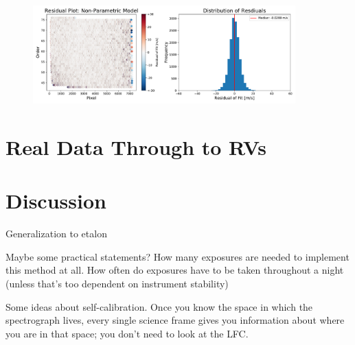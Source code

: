 \documentclass[12pt, letterpaper]{article}
\newcommand{\acronym}[1]{{\small{#1}}}
\newcommand{\lfc}{\acronym{LFC}}
\begin{document}
\begin{figure}[h]
\centering
\includegraphics[width=0.9\textwidth]{Figures/noHierc.pdf}
\caption{}
\label{fig:intpFit}
\end{figure} 

\section{Real Data Through to RVs} \label{sec:realdata}

\section{Discussion} \label{sec:discussion}

Generalization to etalon

Maybe some practical statements?  How many exposures are needed to implement this method at all.  How often do exposures have to be taken throughout a night (unless that's too dependent on instrument stability)

Some ideas about self-calibration. Once you know the space in which the
spectrograph lives, every single science frame gives you information about
where you are in that space; you don't need to look at the \lfc.
\end{document}
